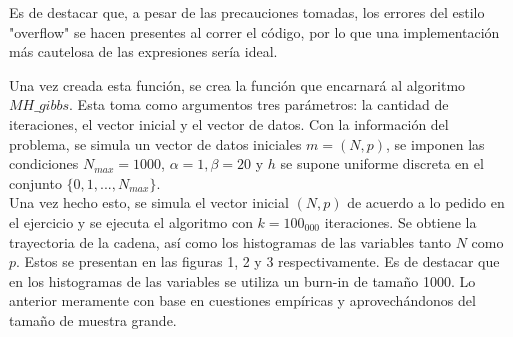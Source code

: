 \documentclass[letterpaper]{article}
\newcommand{\1}{\mathds{1}}
\theoremstyle{definition}
\theoremstyle{definition}
\theoremstyle{definition}
\theoremstyle{definition}
\theoremstyle{definition}
\begin{document}
\begin{itemize}
    Es de destacar que, a pesar de las precauciones tomadas, los errores del estilo "overflow" se hacen presentes al correr el código, por lo que una implementación más 
    cautelosa de las expresiones sería ideal.
    \newline

    Una vez creada esta función, se crea la función que encarnará al algoritmo $MH\_gibbs$. Esta toma como argumentos tres parámetros: la cantidad de iteraciones, el 
    vector inicial y el vector de datos. Con la información del problema, se simula un vector de datos iniciales $m=(N,p)$, se imponen las condiciones $N_{max}=1000$, 
    $\alpha=1,\beta=20$ y $h$ se supone uniforme discreta en el conjunto $\{0,1,...,N_{max}\}$.\\

    Una vez hecho esto, se simula el vector inicial $(N,p)$ de acuerdo a lo pedido en el ejercicio y se ejecuta el algoritmo con $k=100_000$ iteraciones. Se obtiene la trayectoria 
    de la cadena, así como los histogramas de las variables tanto $N$ como $p$. Estos se presentan en las figuras 1, 2 y 3 respectivamente. Es de destacar que en los histogramas 
    de las variables se utiliza un burn-in de tamaño 1000. Lo anterior meramente con base en cuestiones empíricas y aprovechándonos del tamaño de muestra grande.
    

\end{itemize}
\end{document}
